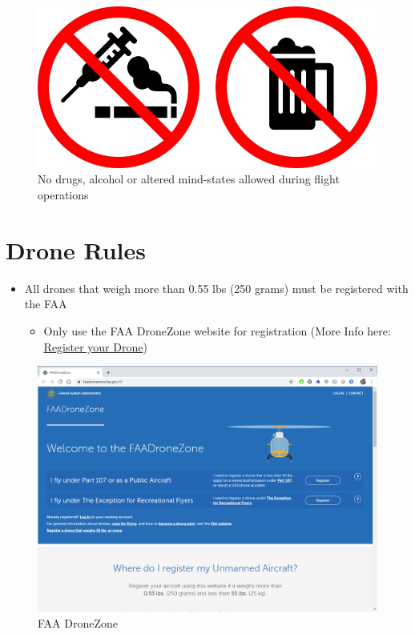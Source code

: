 \documentclass[
]{book}
\providecommand{\tightlist}{%
  \setlength{\itemsep}{0pt}\setlength{\parskip}{0pt}}
\begin{document}
\begin{figure}

{\centering \includegraphics[width=0.7\linewidth]{images/no_drugs} 

}

\caption{No drugs, alcohol or altered mind-states allowed during flight operations}\label{fig:drugs}
\end{figure}

\hypertarget{drone-rules}{%
\section{Drone Rules}\label{drone-rules}}

\begin{itemize}
\tightlist
\item
  All drones that weigh more than 0.55 lbs (250 grams) must be registered with the FAA

  \begin{itemize}
  \tightlist
  \item
    Only use the FAA DroneZone website for registration (More Info here: \protect\hyperlink{ch-registration}{Register your Drone})
  \end{itemize}
\end{itemize}

\begin{figure}

{\centering \includegraphics[width=0.8\linewidth]{images/reg_site} 

}

\caption{FAA DroneZone}\label{fig:reg-page2}
\end{figure}
\end{document}
